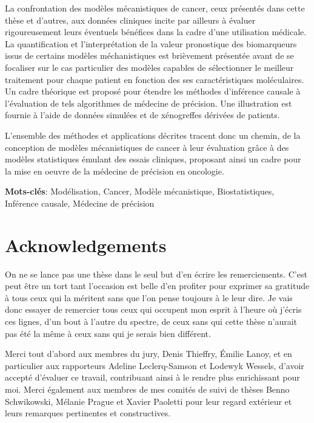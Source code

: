 \documentclass[a4paper,12pt,twoside,onecolumn,openright,final,oldfontcommands]{memoir}
\newcommand{\initial}[1]{
	\lettrine[lines=3,lhang=0.33,nindent=0em]{
		\color{gray}
     		{\textsc{#1}}}{}}
\newcommand\blankpage{%
    \null
    \thispagestyle{empty}%
    \newpage
    }
\begin{document}
La confrontation des modèles mécanistiques de cancer, ceux présentés
dans cette thèse et d'autres, aux données cliniques incite par ailleurs
à évaluer rigoureusement leurs éventuels bénéfices dans la cadre d'une
utilisation médicale. La quantification et l'interprétation de la valeur
pronostique des biomarqueurs issus de certains modèles méchanistiques
est brièvement présentée avant de se focaliser sur le cas particulier
des modèles capables de sélectionner le meilleur traitement pour chaque
patient en fonction des ses caractéristiques moléculaires. Un cadre
théorique est proposé pour étendre les méthodes d'inférence causale à
l'évaluation de tels algorithmes de médecine de précision. Une
illustration est fournie à l'aide de données simulées et de xénogreffes
dérivées de patients.

L'ensemble des méthodes et applications décrites tracent donc un chemin,
de la conception de modèles mécanistiques de cancer à leur évaluation
grâce à des modèles statistiques émulant des essais cliniques, proposant
ainsi un cadre pour la mise en oeuvre de la médecine de précision en
oncologie.

\vspace{\baselineskip}

\textbf{Mots-clés}: Modélisation, Cancer, Modèle mécanistique,
Biostatistiques, Inférence causale, Médecine de précision

\afterpage{\blankpage}

\chapter*{Acknowledgements}

\initial{O}n ne se lance pas une thèse dans le seul but d'en écrire les
remerciements. C'est peut être un tort tant l'occasion est belle d'en
profiter pour exprimer sa gratitude à tous ceux qui la méritent sans que
l'on pense toujours à le leur dire. Je vais donc essayer de remercier
tous ceux qui occupent mon esprit à l'heure où j'écris ces lignes, d'un
bout à l'autre du spectre, de ceux sans qui cette thèse n'aurait pas été
la même à ceux sans qui je serais bien différent.

Merci tout d'abord aux membres du jury, Denis Thieffry, Émilie Lanoy, et
en particulier aux rapporteurs Adeline Leclerq-Samson et Lodewyk
Wessels, d'avoir accepté d'évaluer ce travail, contribuant ainsi à le
rendre plus enrichissant pour moi. Merci également aux membres de mes
comités de suivi de thèses Benno Schwikowski, Mélanie Prague et Xavier
Paoletti pour leur regard extérieur et leurs remarques pertinentes et
constructives.
\end{document}
